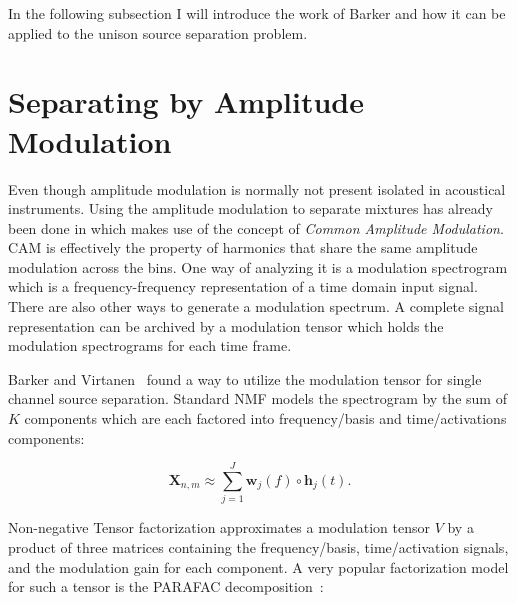 In the following subsection I will introduce the work of Barker and how it can be applied to the unison source separation problem.

\section{Separating by Amplitude Modulation}
\label{sub:am}



Even though amplitude modulation is normally not present isolated in acoustical instruments.
Using the amplitude modulation to separate mixtures has already been done in \cite{li09} which makes use of the concept of \emph{Common Amplitude Modulation}.
\textsc{CAM} is effectively the property of harmonics that share the same amplitude modulation across the bins.
One way of analyzing it is a modulation spectrogram which is a frequency-frequency representation of a time domain input signal.
There are also other ways to generate a modulation spectrum.
A complete signal representation can be archived by a modulation tensor which holds the modulation spectrograms for each time frame.


Barker and Virtanen~\cite{barker13} found a way to utilize the modulation tensor for single channel source separation. Standard NMF models the spectrogram by the sum of $K$ components which are each factored into frequency/basis and time/activations components:

\begin{equation}
   \mathbf{X}_{n,m} \approx \sum\limits_{j=1}^{J} \mathbf{w}_{j}(f) \circ  \mathbf{h}_{j}(t).
\end{equation}

Non-negative Tensor factorization approximates a modulation tensor \(V\) by a product of three matrices containing the frequency/basis, time/activation signals, and the modulation gain for each component.
A very popular factorization model for such a tensor is the PARAFAC decomposition~\cite{nmfbook}:

